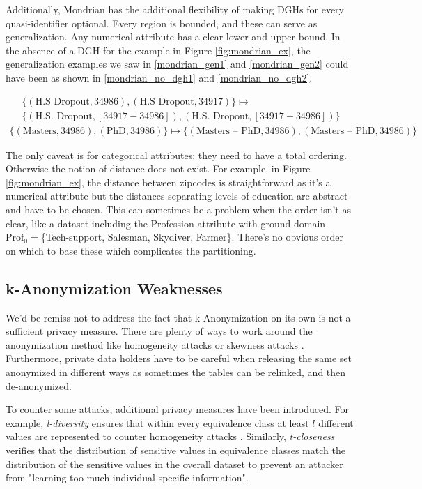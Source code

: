 Additionally, Mondrian has the additional flexibility of making DGHs for every quasi-identifier optional. Every region is bounded, and these can serve as generalization. Any numerical attribute has a clear lower and upper bound. In the absence of a DGH for the example in Figure \ref{fig:mondrian_ex}, the generalization examples we saw in \eqref{mondrian_gen1} and \eqref{mondrian_gen2} could have been as shown in \eqref{mondrian_no_dgh1} and \eqref{mondrian_no_dgh2}.

\begin{multline}
    \{(\mbox{H.S Dropout}, 34986), (\mbox{H.S Dropout}, 34917)\} \mapsto \\
    \{(\mbox{H.S. Dropout}, [34917-34986]),(\mbox{H.S. Dropout},
    [34917-34986]) \}
    \label{mondrian_no_dgh1}
\end{multline}
\begin{multline}
     \{(\mbox{Masters}, 34986), (\mbox{PhD}, 34986)\} \mapsto \{(\mbox{Masters -- PhD}, 34986), (\mbox{Masters -- PhD}, 34986)\}
     \label{mondrian_no_dgh2}
\end{multline}

The only caveat is for categorical attributes: they need to have a total ordering. Otherwise the notion of distance does not exist. For example, in Figure \ref{fig:mondrian_ex}, the distance between zipcodes is straightforward as it's a numerical attribute but the distances separating levels of education are abstract and have to be chosen. This can sometimes be a problem when the order isn't as clear, like a dataset including the Profession attribute with ground domain $\mbox{Prof}_0 = $\{Tech-support, Salesman, Skydiver, Farmer\}. There's no obvious order on which to base these which complicates the partitioning. 



\subsection{k-Anonymization Weaknesses}
We'd be remiss not to address the fact that k-Anonymization on its own is not a sufficient privacy measure. There are plenty of ways to work around the anonymization method like homogeneity attacks\cite{ldiversity} or skewness attacks \cite{critique_kanon}. Furthermore, private data holders have to be careful when releasing the same set anonymized in different ways as sometimes the tables can be relinked, and then de-anonymized\cite{kanon_orig}.

To counter some attacks, additional privacy measures have been introduced. For example, \textit{l-diversity} ensures that within every equivalence class at least $l$ different values are represented to counter homogeneity attacks \cite{ldiversity}. Similarly, \textit{t-closeness} verifies that the distribution of sensitive values in equivalence classes match the distribution of the sensitive values in the overall dataset to prevent an attacker from "learning too much individual-specific information"\cite{tcloseness}.

